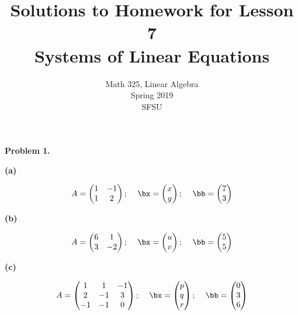 \documentclass[oneside,12pt]{amsart}
\begin{document}
\title{Solutions to Homework for Lesson 7 \\ Systems of Linear Equations}
\author{Math 325, Linear Algebra \\ Spring 2019 \\ SFSU }
\date{}

\maketitle

\textbf{Problem 1.}

\smallskip

\textbf{(a)}

$$
\begin{matrix}
A=
\begin{pmatrix}
1 & -1 \\
1 & 2
\end{pmatrix}
\text{; }
&
\bx=
\begin{pmatrix}
x \\ y
\end{pmatrix}
\text{;  }
&
\bb=
\begin{pmatrix}
7 \\ 3
\end{pmatrix}
\end{matrix}
$$

\textbf{(b)}

$$
\begin{matrix}
A=
\begin{pmatrix}
6 & 1 \\
3 & -2
\end{pmatrix}
\text{; }
&
\bx=
\begin{pmatrix}
u \\ v
\end{pmatrix}
\text{;  }
&
\bb=
\begin{pmatrix}
5 \\ 5
\end{pmatrix}
\end{matrix}
$$

\textbf{(c)}

$$
\begin{matrix}
A=
\begin{pmatrix}
1 & 1  & -1\\
2 & -1 & 3 \\
-1 & -1 & 0 \\
\end{pmatrix}
\text{; }
&
\bx=
\begin{pmatrix}
p \\ q \\ r
\end{pmatrix}
\text{;  }
&
\bb=
\begin{pmatrix}
0 \\ 3 \\ 6
\end{pmatrix}
\end{matrix}
$$
\end{document}
